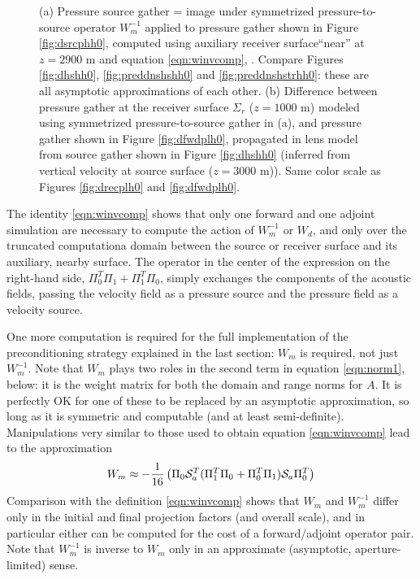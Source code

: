 \documentclass[georeport,12pt]{geophysics}
\begin{document}
\begin{figure}
  \centering
  \caption{(a) Pressure source gather = image
  under symmetrized pressure-to-source operator $W_m^{-1}$ applied to pressure gather
  shown in Figure \ref{fig:dsrcphh0}, computed using
  auxiliary receiver surface``near''  at $z=2900$ m and 
  equation \ref{eqn:winvcomp}, . Compare Figures
  \ref{fig:dhshh0}, \ref{fig:preddnshshh0} and
  \ref{fig:preddnshstrhh0}: these are all asymptotic approximations of
  each other. (b) Difference between pressure gather at the receiver
  surface $\Sigma_r$  ($z=1000$ m) modeled using symmetrized
  pressure-to-source gather in (a), and pressure gather shown in Figure \ref{fig:dfwdplh0},
  propagated in lens model from 
  source gather shown in Figure \ref{fig:dhshh0} (inferred from vertical velocity at source
  surface ($z=3000$ m)). Same color scale as
  Figures \ref{fig:drecplh0} and \ref{fig:dfwdplh0}.}
\end{figure}

The identity \ref{eqn:winvcomp} shows that only one forward and one adjoint simulation
are necessary to compute the action of $W_m^{-1}$ or $W_d$, and only
over the truncated computationa domain between the source or receiver
surface and its auxiliary, nearby surface. The operator
in the center of the expression on the right-hand side, $\Pi_0^T\Pi_1
+ \Pi_1^T\Pi_0$, simply exchanges the components of the acoustic
fields, passing the velocity field as a pressure source and the
pressure field as a velocity source.

One more computation is required for the full implementation of the
preconditioning strategy explained in the last section: $W_m$ is
required, not just $W_m^{-1}$. Note that $W_m$ plays two roles in the
second term in equation \ref{eqn:norm1}, below: it is the weight matrix for
both the domain and range norms for $A$. It is perfectly OK for one of
these to be replaced by an asymptotic approximation, so long as it is
symmetric and computable (and at least semi-definite). Manipulations
very similar to those used to obtain equation \ref{eqn:winvcomp} lead
to the approximation
\begin{equation}
  \label{wcomp}
 W_m \approx -\frac{1}{16}\left(\Pi_0 {\cal S}_a^T
   (\Pi_1^T \Pi_0 + \Pi_0^T \Pi_1) {\cal S}_a \Pi_0^T\right)
\end{equation}
Comparison with the definition \ref{eqn:winvcomp} shows that
$W_m$ and $W_m^{-1}$ differ only in the initial and
final projection factors (and overall scale), and in particular either
can be computed for the cost of a forward/adjoint operator pair. Note
that $W_m^{-1}$ is inverse to $W_m$ only in an
approximate (asymptotic, aperture-limited) sense.
\end{document}
